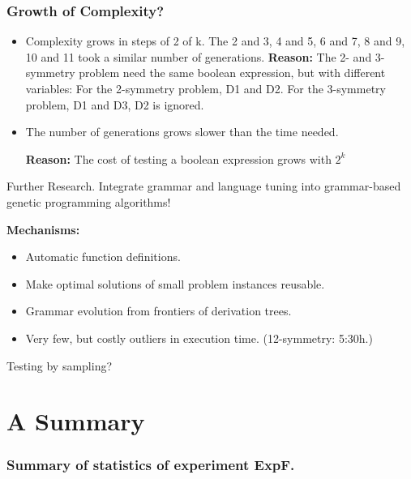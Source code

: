 \documentclass[18pt,c]{beamer}
\makeatletter
\let\beamer@writeslidentry@miniframeson=\beamer@writeslidentry
\newcommand*{\miniframeson}{\let\beamer@writeslidentry=\beamer@writeslidentry@miniframeson}
\makeatother
\begin{document}
\begin{frame}
\frametitle{
Growth of Complexity?
}
\begin{itemize}
\item Complexity grows in steps of 2 of k.
       The 2 and 3, 4 and 5, 6 and 7, 8 and 9, 10 and 11 took 
       a similar number of generations.
{\bf Reason:}
       The 2- and 3-symmetry problem need the same boolean expression,
       but with different variables:
       For the 2-symmetry problem, D1 and D2.
       For the 3-symmetry problem, D1 and D3,
       D2 is ignored.
\item The number of generations grows slower than the time needed.
 
  {\bf Reason:} The cost of testing a boolean expression grows with $2^k$
 
\end{itemize}
\end{frame}%
\begin{frame}
\vspace*{2mm}
\begin{block}{
Further Research.
}
Integrate grammar and language tuning
into grammar-based genetic programming algorithms!
  
{\bf Mechanisms:}
\begin{itemize}
\item Automatic function definitions.
\item Make optimal solutions of small problem instances reusable.
\item Grammar evolution from frontiers of derivation trees.
\item Very few, but costly outliers in execution time. (12-symmetry: 5:30h.)
\end{itemize}
 
Testing by sampling?
\end{block}
\end{frame}%
\miniframeson
\section{A Summary}
 \begin{frame}
 \fontsize{8pt}{9pt}\selectfont
 \frametitle{ Summary of statistics of experiment ExpF. }

 \label{ExpFStatsTable003.tex}  
 \end{frame}
\end{document}
